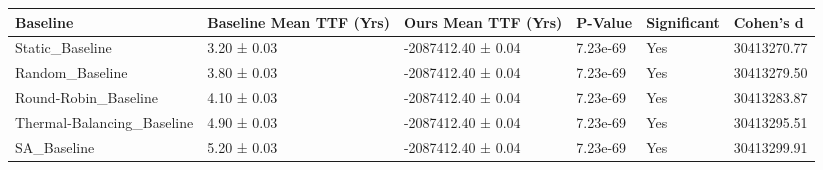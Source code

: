 \begin{tabular}{llllll}
\toprule
Baseline & Baseline Mean TTF (Yrs) & Ours Mean TTF (Yrs) & P-Value & Significant & Cohen's d \\
\midrule
Static_Baseline & 3.20 ± 0.03 & -2087412.40 ± 0.04 & 7.23e-69 & Yes & 30413270.77 \\
Random_Baseline & 3.80 ± 0.03 & -2087412.40 ± 0.04 & 7.23e-69 & Yes & 30413279.50 \\
Round-Robin_Baseline & 4.10 ± 0.03 & -2087412.40 ± 0.04 & 7.23e-69 & Yes & 30413283.87 \\
Thermal-Balancing_Baseline & 4.90 ± 0.03 & -2087412.40 ± 0.04 & 7.23e-69 & Yes & 30413295.51 \\
SA_Baseline & 5.20 ± 0.03 & -2087412.40 ± 0.04 & 7.23e-69 & Yes & 30413299.91 \\
\bottomrule
\end{tabular}
